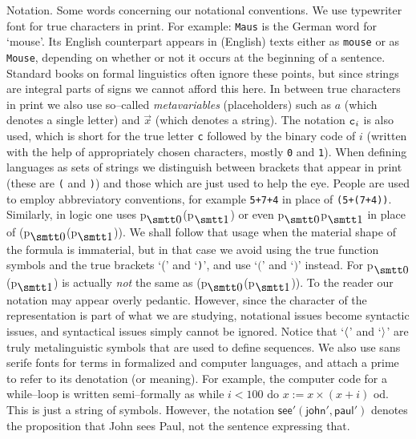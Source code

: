 {\sc Notation.} Some words concerning our notational conventions.
We use typewriter font for true characters in print. For example:
{\tt Maus} is the German word for `mouse'. Its English counterpart
appears in (English) texts either as {\tt mouse} or as {\tt Mouse}, 
depending on whether or not it occurs at the beginning of
a sentence. Standard books on formal linguistics often ignore
these points, but since strings are integral parts of signs we
cannot afford this here. In between true characters in print we
also use so--called {\it metavariables\/} (placeholders) such as
$a$ (which denotes a single letter) and $\vec{x}$ (which denotes a
string). The notation $\mbox{\tt c}_i$ is also used, which is
short for the true letter {\tt c} followed by the binary code of
$i$ (written with the help of appropriately chosen characters, 
mostly {\tt 0} and {\tt 1}).  When defining languages as sets of
strings we distinguish between brackets that appear in print
(these are {\tt (} and {\tt )}) and those which are just used to
help the eye. People are used to employ abbreviatory conventions,
for example {\tt 5+7+4} in place of {\tt (5+(7+4))}. Similarly, in 
logic one uses {\mtt p$_{\snull}$(p$_{\seins}$)} 
or even {\mtt p$_{\snull}$p$_{\seins}$} in place 
of {\mtt (p$_{\snull}$(p$_{\seins}$))}. We shall 
follow that usage when the material shape of the formula is immaterial, 
but in that case we avoid using the true function symbols and 
the true brackets `{\mtt (}' and `{\tt )}', and use `$($' and 
`$)$' instead. For {\mtt p$_{\snull}$(p$_{\seins}$)} 
is actually {\it not\/} the same as 
{\mtt (p$_{\snull}$(p$_{\seins}$))}. To the 
reader our notation may appear overly pedantic. However, 
since the character of the representation is part of what we are 
studying, notational issues become syntactic issues, and syntactical 
issues simply cannot be ignored. Notice that 
`$\langle$' and `$\rangle$' are truly metalinguistic symbols that
are used to define sequences. We also use sans serife fonts for terms
in formalized and computer languages, and attach a prime to refer
to its denotation (or meaning). For example, the computer code for 
a while--loop is written semi--formally as \textsf{while $i < 100$ do 
$x := x \times (x + i)$ od}. This is just a string of symbols.
However, the notation $\textsf{see}'(\textsf{john}', \textsf{paul}')$ 
denotes the proposition that John sees Paul, not the
sentence expressing that.
